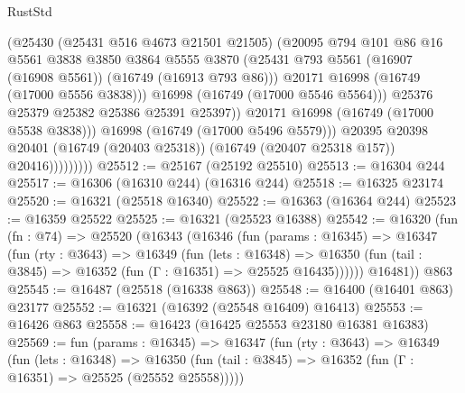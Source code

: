 \begin{lexlean}{RustStd}
\begin{coremodule}
                              (@25430
                                (@25431 @516 @4673 @21501 @21505)
                                (@20095
                                  @794
                                  @101
                                  @86
                                  @16
                                  @5561
                                  @3838
                                  @3850
                                  @3864
                                  @5555
                                  @3870
                                  (@25431
                                    @793
                                    @5561
                                    (@16907 (@16908 @5561))
                                    (@16749 (@16913 @793 @86)))
                                  @20171
                                  @16998
                                  (@16749 (@17000 @5556 @3838)))
                                @16998
                                (@16749 (@17000 @5546 @5564)))
                              @25376
                              @25379
                              @25382
                              @25386
                              @25391
                              @25397))
                          @20171
                          @16998
                          (@16749 (@17000 @5538 @3838)))
                        @16998
                        (@16749 (@17000 @5496 @5579)))
                      @20395
                      @20398
                      @20401
                      (@16749 (@20403 @25318))
                      (@16749 (@20407 @25318 @157))
                      @20416)))))))))
@25512 := @25167 (@25192 @25510)
@25513 := @16304 @244
@25517 := @16306 (@16310 @244) (@16316 @244)
@25518 := @16325 @23174
@25520 := @16321 (@25518 @16340)
@25522 := @16363 (@16364 @244)
@25523 := @16359 @25522
@25525 := @16321 (@25523 @16388)
@25542 := @16320
    (fun (fn : @74) =>
    @25520
      (@16343
        (@16346
          (fun (params : @16345) =>
          @16347
            (fun (rty : @3643) =>
            @16349
              (fun (lets : @16348) =>
              @16350 (fun (tail : @3845) => @16352 (fun (Γ : @16351) => @25525 @16435))))))
        @16481))
    @863
@25545 := @16487 (@25518 (@16338 @863))
@25548 := @16400 (@16401 @863) @23177
@25552 := @16321 (@16392 (@25548 @16409) @16413)
@25553 := @16426 @863
@25558 := @16423 (@16425 @25553 @23180 @16381 @16383)
@25569 := fun (params : @16345) =>
  @16347
    (fun (rty : @3643) =>
    @16349
      (fun (lets : @16348) =>
      @16350 (fun (tail : @3845) => @16352 (fun (Γ : @16351) => @25525 (@25552 @25558)))))

\end{coremodule}
\end{lexlean}
